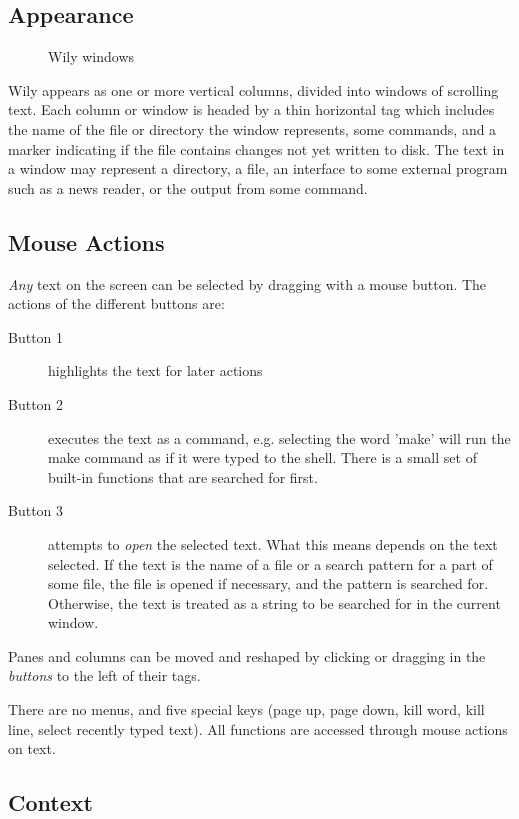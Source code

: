 \documentclass[twocolumn]{article}
\begin{document}
	\subsection{Appearance}
\begin{figure}
\caption{Wily windows}{}
\end{figure}

Wily appears as one or more vertical columns,
divided into windows of scrolling text. Each column or window is
headed by a thin horizontal tag which includes the
name of the file or directory the window represents, some
commands, and a marker indicating if the file contains
changes not yet written to disk.  The text in a window may represent
a directory, a file, an interface to some external program such as
a news reader, or the output from some command.

	\subsection{Mouse Actions}
\emph{Any} text on the screen can be selected by dragging
with a mouse button.  The actions of the different buttons are:
\begin{description}
\item[Button 1] highlights the text for later actions
\item[Button 2] executes the text as a command, e.g. selecting
	the word 'make' will run the make command as if it were typed
	to the shell.  There is a small set of built-in functions that
	are searched for first.
\item[Button 3] attempts to \emph{open} the selected text.
	What this means depends on the text selected. 
	If the text is the name of a file or a search pattern for
	a part of some file, the file is opened if necessary, and
	the pattern is searched for.  Otherwise, the text is treated
	as a string to be searched for in the current window.
\end{description}

Panes and columns can be moved and reshaped by clicking
or dragging in the \emph{buttons} to the left of their tags.

There are no menus, and five special keys
(page up, page down, kill word, kill line, select
recently typed text).  All functions
are accessed through mouse actions on text.

	\subsection{Context}
\end{document}
